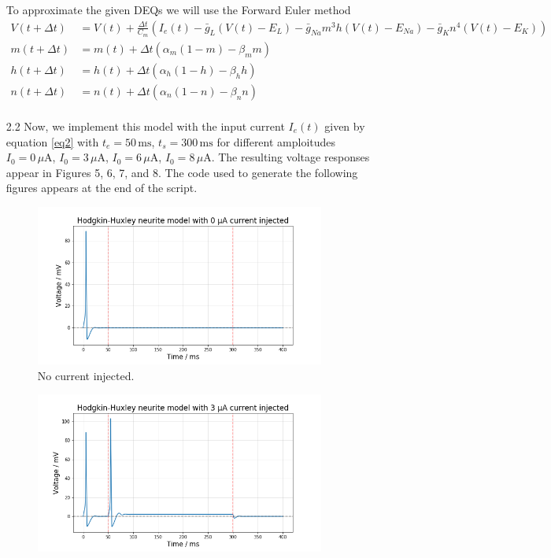 \documentclass[12pt]{article}
\begin{document}
\begin{enumerate}
        To approximate the given DEQs we will use the Forward Euler method
        \begin{align*}
            V(t + \Delta t) &= V(t) + \frac{\Delta t}{C_{m}}\left(I_{e}(t) - \bar{g}_{L}\left(V(t)-E_{L}\right) - \bar{g}_{Na}m^{3}h\left(V(t)-E_{Na}\right) - \bar{g}_{K}n^{4}\left(V(t)-E_{K}\right)\right)\\
            m(t + \Delta t) &= m(t) + \Delta t\left(\alpha_{m}\left(1-m\right)-\beta_{m}m\right)\\
            h(t + \Delta t) &= h(t) + \Delta t\left(\alpha_{h}\left(1-h\right)-\beta_{h}h\right)\\
            n(t + \Delta t) &= n(t) + \Delta t\left(\alpha_{n}\left(1-n\right)-\beta_{n}n\right)\\
        \end{align*}
        \item[2.2] Now, we implement this model with the input current $I_{e}(t)$ given by equation \ref{eq2} with $t_{e}=50 \, \text{ms}$, 
        $t_{s}=300 \, \text{ms}$ for different amploitudes $I_{0}=0 \, \mu \text{A}$, $I_{0}=3 \, \mu \text{A}$, $I_{0}=6 \, \mu \text{A}$, $I_{0}=8 \, \mu \text{A}$.
        The resulting voltage responses appear in Figures 5, 6, 7, and 8. The code used to generate the following figures appears at the end of the script.
        \begin{figure}[h]
            \centering
            \includegraphics[width=0.9\textwidth]{Current_0A.png}
            \caption{No current injected.}
        \end{figure}
        \begin{figure}[h]
            \centering
            \includegraphics[width=0.9\textwidth]{Current_3A.png}

\end{figure}
\end{enumerate}
\end{document}
